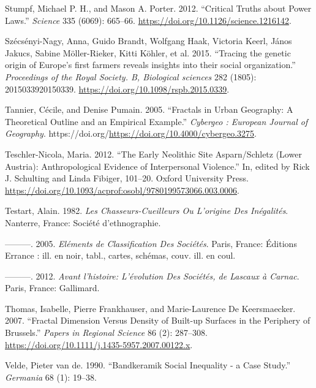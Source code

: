 \documentclass[
  12pt,
  a4paper, twoside]{book}
\newlength{\cslhangindent}
\newlength{\cslentryspacingunit} %
\newenvironment{CSLReferences}[2] %
 {%
  \setlength{\parindent}{0pt}
  \ifodd #1
  \let\oldpar\par
  \def\par{\hangindent=\cslhangindent\oldpar}
  \fi
  \setlength{\parskip}{#2\cslentryspacingunit}
 }%
 {}
\begin{document}
\begin{CSLReferences}{1}{0}
\leavevmode{}%
Stumpf, Michael P. H., and Mason A. Porter. 2012. {``Critical Truths about Power Laws.''} \emph{Science} 335 (6069): 665--66. \url{https://doi.org/10.1126/science.1216142}.

\leavevmode{}%
Szécsényi-Nagy, Anna, Guido Brandt, Wolfgang Haak, Victoria Keerl, János Jakucs, Sabine Möller-Rieker, Kitti Köhler, et al. 2015. {``Tracing the genetic origin of Europe's first farmers reveals insights into their social organization.''} \emph{Proceedings of the Royal Society. B, Biological sciences} 282 (1805): 2015033920150339. \url{https://doi.org/10.1098/rspb.2015.0339}.

\leavevmode{}%
Tannier, Cécile, and Denise Pumain. 2005. {``Fractals in Urban Geography: A Theoretical Outline and an Empirical Example.''} \emph{Cybergeo : European Journal of Geography}. https://doi.org/\url{https://doi.org/10.4000/cybergeo.3275}.

\leavevmode{}%
Teschler-Nicola, Maria. 2012. {``The Early Neolithic Site Asparn/Schletz (Lower Austria): Anthropological Evidence of Interpersonal Violence.''} In, edited by Rick J. Schulting and Linda Fibiger, 101--20. Oxford University Press. \url{https://doi.org/10.1093/acprof:osobl/9780199573066.003.0006}.

\leavevmode{}%
Testart, Alain. 1982. \emph{Les Chasseurs-Cueilleurs Ou L'origine Des Inégalités}. Nanterre, France: Société d'ethnographie.

\leavevmode{}%
---------. 2005. \emph{Eléments de Classification Des Sociétés}. Paris, France: Éditions Errance : ill. en noir, tabl., cartes, schémas, couv. ill. en coul.

\leavevmode{}%
---------. 2012. \emph{Avant l'histoire: L'évolution Des Sociétés, de Lascaux à Carnac}. Paris, France: Gallimard.

\leavevmode{}%
Thomas, Isabelle, Pierre Frankhauser, and Marie-Laurence De Keersmaecker. 2007. {``Fractal Dimension Versus Density of Built-up Surfaces in the Periphery of Brussels.''} \emph{Papers in Regional Science} 86 (2): 287--308. \url{https://doi.org/10.1111/j.1435-5957.2007.00122.x}.

\leavevmode{}%
Velde, Pieter van de. 1990. {``Bandkeramik Social Inequality - a Case Study.''} \emph{Germania} 68 (1): 19--38.


\end{CSLReferences}
\end{document}
